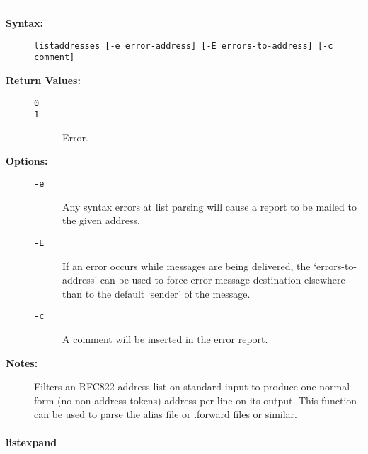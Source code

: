 \hrule
\begin{description}
\item[{\bf Syntax:}] \mbox{}

{\tt listaddresses [-e error-address] [-E errors-to-address] [-c comment]}

\item[{\bf Return Values:}] \mbox{}

\begin{description}
\item[{\tt 0}] \mbox{}



\item[{\tt 1}] \mbox{}

Error.

\end{description}


\item[{\bf Options:}] \mbox{}

\begin{description}
\item[{\tt -e}] \mbox{}

Any syntax errors at list parsing will cause a 
report to be mailed to the given address.

\item[{\tt -E}] \mbox{}

If an error occurs while messages are being delivered, 
the `errors-to-address' can be used to force error message destination 
elsewhere than to the default `sender' of the message.

\item[{\tt -c}] \mbox{}

A comment will be inserted in the error report.

\end{description}


\item[{\bf Notes:}] \mbox{}

Filters an RFC822 address list on standard input 
to produce one normal form (no non-address tokens) address per line on 
its output. This function can be used to parse the alias file or .forward 
files or similar.

\end{description}


\vspace {2pt}


\paragraph{listexpand}

